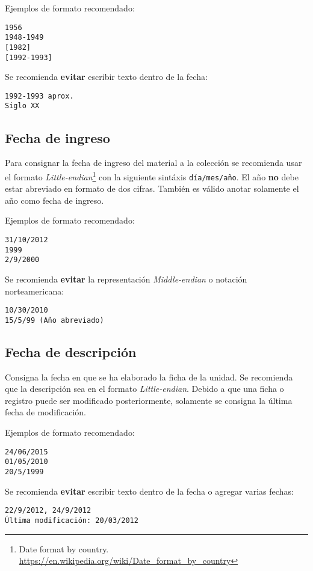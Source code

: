 \documentclass[10pt,letterpaper]{article}
\begin{document}
Ejemplos de formato recomendado:
{\color{Blue}
\begin{verbatim}
1956
1948-1949
[1982]
[1992-1993]
\end{verbatim}
}

Se recomienda \textbf{evitar} escribir texto dentro de la fecha:
{\color{Red}
\begin{verbatim}
1992-1993 aprox. 
Siglo XX
\end{verbatim}
}

\subsection{Fecha de ingreso}
Para consignar la fecha de ingreso del material a la colección se recomienda usar el formato \textit{Little-endian}\footnote{Date format by country. \url{https://en.wikipedia.org/wiki/Date_format_by_country}} con la siguiente sintáxis \verb|día/mes/año|. El año \textbf{no} debe estar abreviado en formato de dos cifras. También es válido anotar solamente el año como fecha de ingreso. 

Ejemplos de formato recomendado:
{\color{Blue}
\begin{verbatim}
31/10/2012
1999
2/9/2000
\end{verbatim}
}

Se recomienda \textbf{evitar} la representación \textit{Middle-endian} o notación norteamericana:
{\color{Red}
\begin{verbatim}
10/30/2010
15/5/99 (Año abreviado)
\end{verbatim}
}

\subsection{Fecha de descripción}
Consigna la fecha en que se ha elaborado la ficha de la unidad. Se recomienda que la descripción sea en el formato \textit{Little-endian}. Debido a que una ficha o registro puede ser modificado posteriormente, solamente se consigna la última fecha de modificación.

Ejemplos de formato recomendado:
{\color{Blue}
\begin{verbatim}
24/06/2015
01/05/2010
20/5/1999
\end{verbatim}
}

Se recomienda \textbf{evitar} escribir texto dentro de la fecha o agregar varias fechas:
{\color{Red}
\begin{verbatim}
22/9/2012, 24/9/2012
Última modificación: 20/03/2012
\end{verbatim}
}
\end{document}
